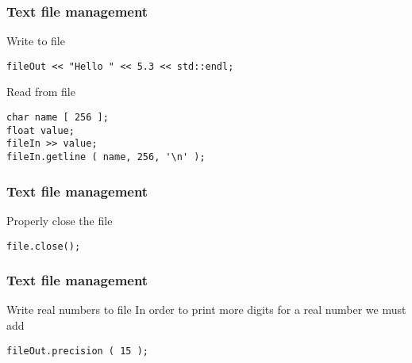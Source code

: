 \documentclass{beamer}
\begin{document}

\begin{frame}[fragile]

    \frametitle{Text file management}

    \begin{block}{Write to file}
        \begin{verbatim}
fileOut << "Hello " << 5.3 << std::endl;
        \end{verbatim}
    \end{block}

    \begin{block}{Read from file}
        \begin{verbatim}
char name [ 256 ];
float value;
fileIn >> value;
fileIn.getline ( name, 256, '\n' );
        \end{verbatim}
    \end{block}

\end{frame}


\begin{frame}[fragile]

    \frametitle{Text file management}

    \begin{block}{Properly close the file}
        \begin{verbatim}
file.close();
        \end{verbatim}
    \end{block}

\end{frame}


\begin{frame}[fragile]

    \frametitle{Text file management}

    \begin{block}{Write real numbers to file}
        In order to print more digits for a real number we must add
        \begin{verbatim}
fileOut.precision ( 15 );
        \end{verbatim}
    \end{block}

\end{frame}

\end{document}
